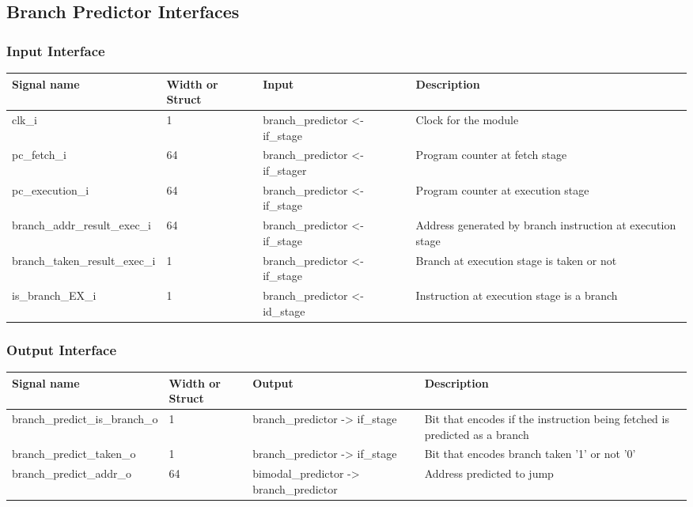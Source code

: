
\subsection{Branch Predictor Interfaces}

\subsubsection{Input Interface}

\begin{table}[H]
\centering
\begin{tabular}{l|p{1.5cm}|p{3cm}|p{4cm}}
\hline
\hline
Signal name & Width or Struct & Input & Description \\
\hline
\hline
clk\_i & 1 & branch\_predictor <- if\_stage & Clock for the module \\
\hline
pc\_fetch\_i & 64 & branch\_predictor <- if\_stager & Program counter at fetch stage \\
\hline
pc\_execution\_i & 64 & branch\_predictor <- if\_stage & Program counter at execution stage \\
\hline
branch\_addr\_result\_exec\_i & 64 & branch\_predictor <- if\_stage & Address generated by branch instruction at execution stage \\
\hline
branch\_taken\_result\_exec\_i & 1 & branch\_predictor <- if\_stage & Branch at execution stage is taken or not \\
\hline
is\_branch\_EX\_i & 1 & branch\_predictor <- id\_stage & Instruction at execution stage is a branch\\
\hline
\hline
\end{tabular}
\end{table}

\subsubsection{Output Interface}

\begin{table}[H]
\centering
\begin{tabular}{l|p{1.5cm}|p{3cm}|p{4cm}}
\hline
\hline
Signal name & Width or Struct & Output & Description \\
\hline
branch\_predict\_is\_branch\_o & 1 & branch\_predictor -> if\_stage & Bit that encodes if the instruction being fetched is predicted as a branch\\
\hline
branch\_predict\_taken\_o & 1 & branch\_predictor -> if\_stage & Bit that encodes branch taken '1' or not '0'\\
\hline
branch\_predict\_addr\_o  & 64 & bimodal\_predictor -> branch\_predictor & Address predicted to jump \\
\hline
\hline
\end{tabular}
\end{table}